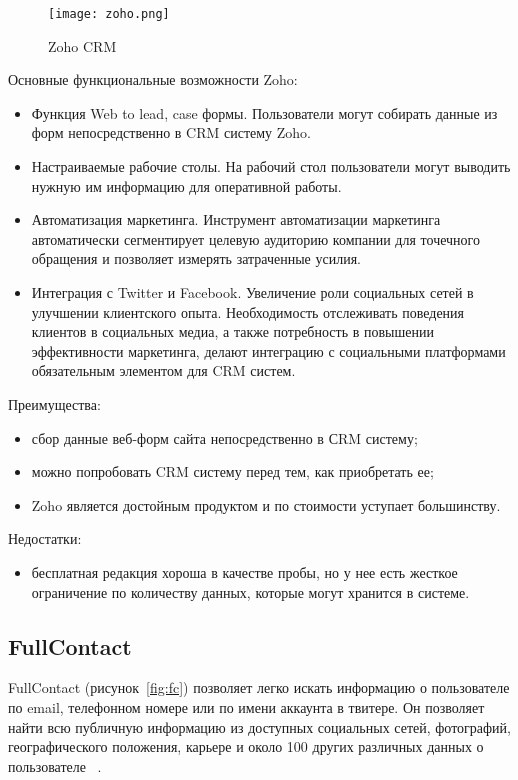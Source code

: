\pagebreak
\begin{figure}[h]
\centering
  \texttt{[image: zoho.png]}  
  \caption{Zoho CRM}
  \label{fig:zoho}
\end{figure}

Основные функциональные возможности Zoho:
\begin{itemize}
\item Функция Web to lead, case формы. Пользователи могут собирать данные из форм непосредственно в CRM систему Zoho.
\item Настраиваемые рабочие столы. На рабочий стол пользователи могут выводить нужную им информацию для оперативной работы.
\item Автоматизация маркетинга. Инструмент автоматизации маркетинга автоматически сегментирует целевую аудиторию компании для точечного обращения и позволяет измерять затраченные усилия.
\item Интеграция с Twitter и Facebook. Увеличение роли социальных сетей в улучшении клиентского опыта. Необходимость отслеживать поведения клиентов в социальных медиа, а также потребность в повышении эффективности маркетинга, делают интеграцию с социальными платформами обязательным элементом для CRM систем.
\end{itemize}

Преимущества: 
\begin{itemize}
\item сбор данные веб-форм сайта непосредственно в СRM систему;
\item можно попробовать CRM систему перед тем, как приобретать ее;
\item Zoho является достойным продуктом и по стоимости уступает большинству.
\end{itemize}

Недостатки: 
\begin{itemize}
\item бесплатная редакция хороша в качестве пробы, но у нее есть жесткое ограничение по количеству данных, которые могут хранится в системе.
\end{itemize}


\subsection{FullContact}
\label{sub:alternatives:fullcontact}
FullContact (рисунок~\ref{fig:fc}) позволяет легко искать информацию о пользователе по email, телефонном номере или по имени аккаунта в твитере. Он позволяет найти всю публичную информацию из доступных социальных сетей, фотографий, географического положения, карьере и около 100 других различных данных о пользователе ~\cite{fullcontact}. 


